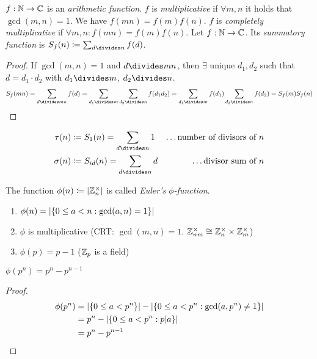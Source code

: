 \documentclass[NumTh.tex]{subfiles}
\begin{document}
\begin{defi}
  $f: \mathbb{N} \to \mathbb{C}$ is an \emph{arithmetic function}.
  $f$ is \emph{multiplicative} if $\forall m,n $ it holds that $\gcd(m,n) = 1$. We have $f(mn) = f(m) f(n)$.
  $f$ is \emph{completely multiplicative} if $\forall m,n: f(mn) = f(m) f(n)$.
  Let $f: \mathbb{N} \to \mathbb{C}$. Its \emph{summatory function} is $S_{f}(n) \coloneq \sum_{d\divides n} f(d)$.
\end{defi}
\begin{proof}
  If $\gcd(m,n) = 1$ and $d\divides mn$, then $\exists$ unique $d_1,d_2$ such that $d = d_1 \cdot d_2$ with $d_1 \divides  m$, $d_2\divides n$.
  \[S_f (mn) = \sum_{d\divides mn} f(d) = \sum_{d_1\divides m} \sum_{d_2\divides n} f(d_1 d_2) = \sum_{d_1\divides m} f(d_1) \sum_{d_2\divides n} f(d_2) = S_f(m) S_f(n)\]
\end{proof}

\begin{ex}
  \begin{align*}
    \tau(n) &\coloneq S_1(n) = \sum_{d\divides n} 1 &\text{\dots number of divisors of $n$} \\
    \sigma(n) &\coloneq S_{id}(n) = \sum_{d\divides n} d &\text{\dots divisor sum of $n$}
  \end{align*}
\end{ex}

\begin{defi}
  The function $\phi(n) \coloneq \left\vert{\mathbb{Z}_n^\times}\right\vert$ is called \emph{Euler's $\phi$-function}.
\end{defi}

\begin{rem}
  \begin{enumerate}
    \item $\phi(n) = \left\vert{\left\{ 0 \leq a < n : \gcd(a,n) = 1\right\}}\right\vert$
    \item $\phi$ is multiplicative (CRT: $\gcd(m,n) = 1$. $\mathbb{Z}_{nm}^\times \cong \mathbb{Z}_n^\times \times \mathbb{Z}_m^\times$)
    \item $\phi(p) = p - 1$ ($\mathbb{Z}_p$ is a field)
  \end{enumerate}
\end{rem}

\begin{lemma}
  $\phi(p^n) = p^n - p^{n-1}$
\end{lemma}

\begin{proof}
  \begin{align*}
    \phi(p^n) &= \left\vert{\left\{0 \leq a < p^n\right\}}\right\vert - \left\vert{\left\{0 \leq a < p^n : \gcd(a,p^n) \neq 1\right\}}\right\vert \\
              &= p^n - \left\vert{\left\{0 \leq a < p^n : p|a\right\}}\right\vert \\
              &= p^n - p^{n-1}
  \end{align*}
\end{proof}
\end{document}
